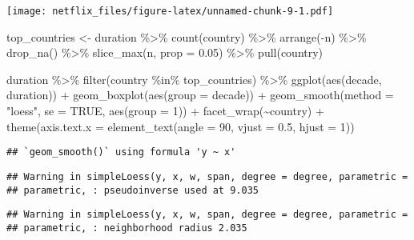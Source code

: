 \documentclass[
]{article}
\newenvironment{Shaded}{\begin{snugshade}}{\end{snugshade}}
\newcommand{\AttributeTok}[1]{\textcolor[rgb]{0.77,0.63,0.00}{#1}}
\newcommand{\ConstantTok}[1]{\textcolor[rgb]{0.00,0.00,0.00}{#1}}
\newcommand{\DecValTok}[1]{\textcolor[rgb]{0.00,0.00,0.81}{#1}}
\newcommand{\FloatTok}[1]{\textcolor[rgb]{0.00,0.00,0.81}{#1}}
\newcommand{\FunctionTok}[1]{\textcolor[rgb]{0.00,0.00,0.00}{#1}}
\newcommand{\NormalTok}[1]{#1}
\newcommand{\OtherTok}[1]{\textcolor[rgb]{0.56,0.35,0.01}{#1}}
\newcommand{\SpecialCharTok}[1]{\textcolor[rgb]{0.00,0.00,0.00}{#1}}
\newcommand{\StringTok}[1]{\textcolor[rgb]{0.31,0.60,0.02}{#1}}
\begin{document}
\texttt{[image: netflix\_files/figure-latex/unnamed-chunk-9-1.pdf]}

\begin{Shaded}
\begin{Highlighting}[]
\NormalTok{top\_countries }\OtherTok{\textless{}{-}}\NormalTok{ duration }\SpecialCharTok{\%\textgreater{}\%} 
  \FunctionTok{count}\NormalTok{(country) }\SpecialCharTok{\%\textgreater{}\%} 
  \FunctionTok{arrange}\NormalTok{(}\SpecialCharTok{{-}}\NormalTok{n) }\SpecialCharTok{\%\textgreater{}\%} 
  \FunctionTok{drop\_na}\NormalTok{() }\SpecialCharTok{\%\textgreater{}\%} 
  \FunctionTok{slice\_max}\NormalTok{(n, }\AttributeTok{prop =} \FloatTok{0.05}\NormalTok{) }\SpecialCharTok{\%\textgreater{}\%} 
  \FunctionTok{pull}\NormalTok{(country)}

\NormalTok{duration }\SpecialCharTok{\%\textgreater{}\%} 
  \FunctionTok{filter}\NormalTok{(country }\SpecialCharTok{\%in\%}\NormalTok{ top\_countries) }\SpecialCharTok{\%\textgreater{}\%} 
  \FunctionTok{ggplot}\NormalTok{(}\FunctionTok{aes}\NormalTok{(decade, duration)) }\SpecialCharTok{+}
  \FunctionTok{geom\_boxplot}\NormalTok{(}\FunctionTok{aes}\NormalTok{(}\AttributeTok{group =}\NormalTok{ decade)) }\SpecialCharTok{+}
  \FunctionTok{geom\_smooth}\NormalTok{(}\AttributeTok{method =} \StringTok{"loess"}\NormalTok{, }\AttributeTok{se =} \ConstantTok{TRUE}\NormalTok{, }\FunctionTok{aes}\NormalTok{(}\AttributeTok{group =} \DecValTok{1}\NormalTok{)) }\SpecialCharTok{+}
  \FunctionTok{facet\_wrap}\NormalTok{(}\SpecialCharTok{\textasciitilde{}}\NormalTok{country) }\SpecialCharTok{+}
  \FunctionTok{theme}\NormalTok{(}\AttributeTok{axis.text.x =} \FunctionTok{element\_text}\NormalTok{(}\AttributeTok{angle =} \DecValTok{90}\NormalTok{, }\AttributeTok{vjust =} \FloatTok{0.5}\NormalTok{, }\AttributeTok{hjust =} \DecValTok{1}\NormalTok{))}
\end{Highlighting}
\end{Shaded}

\begin{verbatim}
## `geom_smooth()` using formula 'y ~ x'
\end{verbatim}

\begin{verbatim}
## Warning in simpleLoess(y, x, w, span, degree = degree, parametric =
## parametric, : pseudoinverse used at 9.035
\end{verbatim}

\begin{verbatim}
## Warning in simpleLoess(y, x, w, span, degree = degree, parametric =
## parametric, : neighborhood radius 2.035
\end{verbatim}
\end{document}
